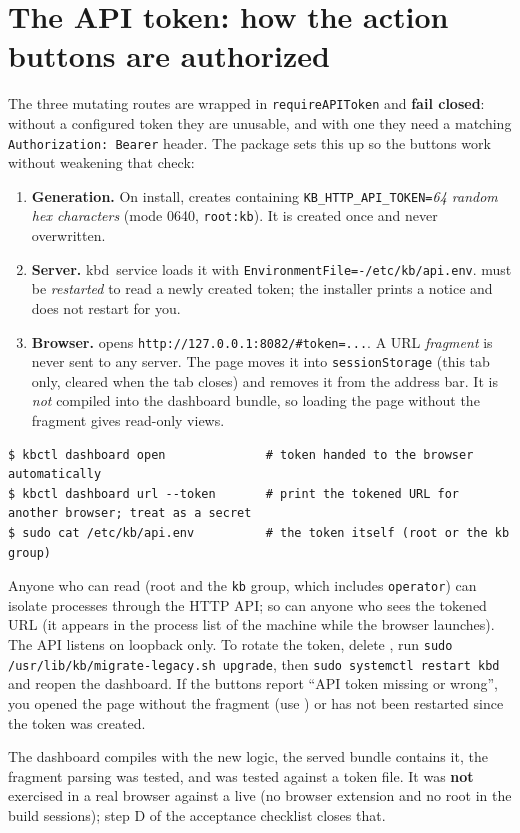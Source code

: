 \section{The API token: how the action buttons are authorized}\label{sec:token}
The three mutating routes are wrapped in \texttt{requireAPIToken} and \textbf{fail closed}: without a configured
token they are unusable, and with one they need a matching \texttt{Authorization: Bearer} header. The package
sets this up so the buttons work without weakening that check:
\begin{enumerate}
\item \textbf{Generation.} On install,  creates  containing \texttt{KB\_HTTP\_API\_TOKEN=}\emph{64 random hex characters} (mode 0640, \texttt{root:kb}). It is created once and never overwritten.
\item \textbf{Server.} \unit{kbd.service} loads it with \texttt{EnvironmentFile=-/etc/kb/api.env}.  must be \emph{restarted} to read a newly created token; the installer prints a notice and does not restart  for you.
\item \textbf{Browser.}  opens \texttt{http://127.0.0.1:8082/\#token=...}. A URL \emph{fragment} is never sent to any server. The page moves it into \texttt{sessionStorage} (this tab only, cleared when the tab closes) and removes it from the address bar. It is \emph{not} compiled into the dashboard bundle, so loading the page without the fragment gives read-only views.
\end{enumerate}
\begin{lstlisting}[style=console]
$ kbctl dashboard open              # token handed to the browser automatically
$ kbctl dashboard url --token       # print the tokened URL for another browser; treat as a secret
$ sudo cat /etc/kb/api.env          # the token itself (root or the kb group)
\end{lstlisting}
\begin{kbwarn}
Anyone who can read  (root and the \texttt{kb} group, which includes \texttt{operator}) can
isolate processes through the HTTP API; so can anyone who sees the tokened URL (it appears in the process list
of the machine while the browser launches). The API listens on loopback only. To rotate the token, delete
, run \texttt{sudo /usr/lib/kb/migrate-legacy.sh upgrade}, then \texttt{sudo systemctl restart kbd}
and reopen the dashboard. If the buttons report ``API token missing or wrong'', you opened the page without
the fragment (use ) or  has not been restarted since the token was created.
\end{kbwarn}
\begin{kbnote}
The dashboard compiles with the new logic, the served bundle contains it, the fragment parsing was tested, and
 was tested against a token file. It was \textbf{not} exercised in a real
browser against a live  (no browser extension and no root in the build sessions); step D of the acceptance
checklist closes that.
\end{kbnote}


